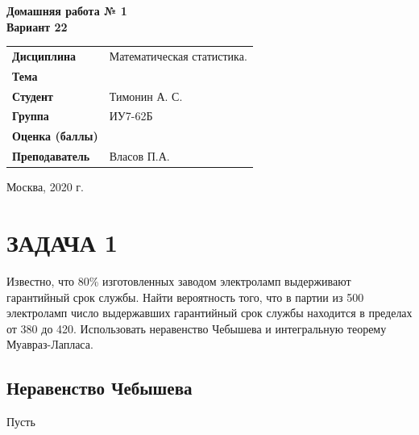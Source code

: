 \documentclass[12pt, a4paper]{report}
\begin{document}
\begin{titlepage}
  	\vspace{2cm}
  	
  	\begin{center}
  		\textbf{Домашняя работа № 1} \\
  		\vspace{0.5cm}
  		\textbf{Вариант 22}
  	\end{center}
  	
  	\vspace{4cm}
  	
  	\begin{flushleft}
  		\begin{tabular}{ll}
  			\textbf{Дисциплина} & Математическая статистика. \\
  			\textbf{Тема} & \\
  			\textbf{Студент} & Тимонин А. С. \\
  			\textbf{Группа} & ИУ7-62Б \\
  			\textbf{Оценка (баллы)} & \\
  			\textbf{Преподаватель} & Власов П.А. \\
  		\end{tabular}
  	\end{flushleft}
  	
  	\vspace{6cm}
  	
  	\begin{center}
  		Москва, 2020 г.
  	\end{center}
  	
  	
  \end{titlepage}
  
	
	\section{ЗАДАЧА 1}
	
	\hspace{1cm} Известно, что 80\% изготовленных заводом электроламп выдерживают гарантийный срок службы. Найти вероятность того, что в партии из 500 электроламп число выдержавших гарантийный срок службы находится в пределах от 380 до 420. Использовать неравенство Чебышева и интегральную теорему Муавраз-Лапласа.
	
	\subsection{Неравенство Чебышева}
	
	\hspace{0.6cm}Пусть
	
\end{document}
